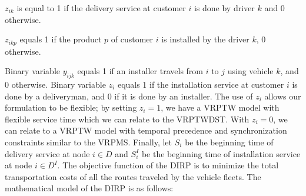 \documentclass{article}
\begin{document}
{$z_{ik}$ is equal to 1 if the delivery service at customer $i$ is done by driver $k$ and 0 otherwise.

$z_{ikp}$ equals 1 if the product $p$ of customer $i$ is installed by the driver $k$, 0 otherwise.


Binary variable $y_{ijk}$ equals 1 if an installer travels from $i$ to $j$ using vehicle $k$, and 0 otherwise. Binary variable $z_{i}$ equals 1 if the installation service at customer $i$ is done by a deliveryman, and 0 if it is done by an installer. The use of $z_i$ allows our formulation to be flexible; by setting $z_i=1$, we have a VRPTW model with flexible service time which we can relate to the VRPTWDST. With $z_i=0$, we can relate to a VRPTW model with temporal precedence and synchronization constraints similar to the VRPMS. Finally, let $S_{i}$ be the beginning time of delivery service at node $i \in D$ and $S^I_{i}$ be the beginning time of installation service at node $i \in D^I$. The objective function of the DIRP is to minimize the total transportation costs of all the routes traveled by the vehicle fleets. The mathematical model of the DIRP is as follows:
\fi

}
\end{document}
